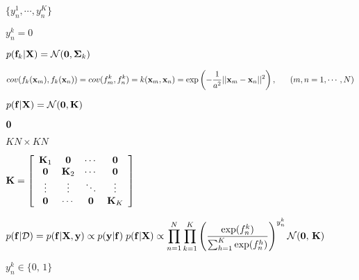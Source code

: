 \documentclass{article}
\def\lthtmlcheckvsize{\ifdim\ht\sizebox<\vsize 
  \ifdim\wd\sizebox<\hsize\expandafter\hfill\fi \expandafter\vfill
  \else\expandafter\vss\fi}%
\begin{document}
{\newpage\clearpage
{}%
$ \{y_n^1,\cdots,y_n^K\}$%
\lthtmlindisplaymathZ
\lthtmlcheckvsize\clearpage}

{\newpage\clearpage
{}%
$ y_n^k=0$%
\lthtmlindisplaymathZ
\lthtmlcheckvsize\clearpage}

{\newpage\clearpage
{}%
$ p({\bf f}_k|{\bf X})={\cal N}({\bf0},{\bf\Sigma}_k)$%
\lthtmlindisplaymathZ
\lthtmlcheckvsize\clearpage}

{\newpage\clearpage
{}%
$\displaystyle cov(f_k({\bf x}_m),f_k({\bf x}_n))=cov(f^k_m,f^k_n)
=k({\bf x}_m,{\bf x}_n)
=\exp\left(-\frac{1}{a^2}||{\bf x}_m-{\bf x}_n||^2\right),
\;\;\;\;\;\;(m,n=1,\cdots,N)$%
\lthtmlindisplaymathZ
\lthtmlcheckvsize\clearpage}

{\newpage\clearpage
{}%
$ p({\bf f}|{\bf X})={\cal N}({\bf0},{\bf K})$%
\lthtmlindisplaymathZ
\lthtmlcheckvsize\clearpage}

{\newpage\clearpage
{}%
$ {\bf0}$%
\lthtmlindisplaymathZ
\lthtmlcheckvsize\clearpage}

{\newpage\clearpage
{}%
$ KN \times KN$%
\lthtmlindisplaymathZ
\lthtmlcheckvsize\clearpage}

{\newpage\clearpage
{}%
$\displaystyle {\bf K}=\left[\begin{array}{cccc}{\bf K}_1 & {\bf0} &\cdots &{\bf0}\\
{\bf0} & {\bf K}_2 & \cdots & {\bf0}\\
\vdots & \vdots & \ddots & \vdots \\
{\bf0} & \cdots & {\bf0} &{\bf K}_K\end{array}\right]$%
\lthtmlindisplaymathZ
\lthtmlcheckvsize\clearpage}

{\newpage\clearpage
{}%
$\displaystyle p({\bf f}|{\cal D})
=p({\bf f}|{\bf X},{\bf y})\propto p({\bf y}|{\bf f})\; p({\bf f}|{\bf X})
\propto\prod_{n=1}^N\prod_{k=1}^K
\left( \frac{\exp(f_n^k)}{\sum_{h=1}^K\exp(f_n^h)} \right)^{y_n^k}
{\cal N}({\bf0},\,{\bf K})$%
\lthtmlindisplaymathZ
\lthtmlcheckvsize\clearpage}

{\newpage\clearpage
{}%
$ y_n^k \in\{0,\,1\}$%
\lthtmlindisplaymathZ
\lthtmlcheckvsize\clearpage}
\end{document}
